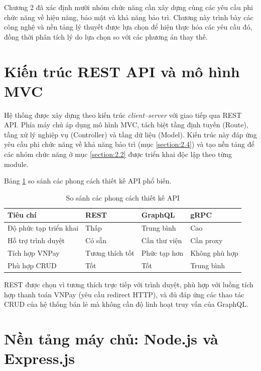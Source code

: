 \documentclass[../DoAn.tex]{subfiles}
\begin{document}
Chương 2 đã xác định mười nhóm chức năng cần xây dựng cùng các yêu cầu phi chức
năng về hiệu năng, bảo mật và khả năng bảo trì. Chương này trình bày các công nghệ
và nền tảng lý thuyết được lựa chọn để hiện thực hóa các yêu cầu đó, đồng thời
phân tích lý do lựa chọn so với các phương án thay thế.

\section{Kiến trúc REST API và mô hình MVC}
\label{section:3.1}

Hệ thống được xây dựng theo kiến trúc \textit{client--server} với giao tiếp qua
REST API. Phía máy chủ áp dụng mô hình MVC, tách biệt tầng
định tuyến (Route), tầng xử lý nghiệp vụ (Controller) và tầng dữ liệu (Model).
Kiến trúc này đáp ứng yêu cầu phi chức năng về khả năng bảo trì (mục
\ref{section:2.4}) và tạo nền tảng để các nhóm chức năng ở mục \ref{section:2.2}
được triển khai độc lập theo từng module.

Bảng \ref{tab:api-style} so sánh các phong cách thiết kế API phổ biến.

\begin{table}[H]
\centering
\caption{So sánh các phong cách thiết kế API}
\label{tab:api-style}
\begin{tabular}{|p{3cm}|p{3.5cm}|p{3.5cm}|p{2cm}|}
\hline
\textbf{Tiêu chí} & \textbf{REST} & \textbf{GraphQL} & \textbf{gRPC} \\
\hline
Độ phức tạp triển khai & Thấp & Trung bình & Cao \\
\hline
Hỗ trợ trình duyệt & Có sẵn & Cần thư viện & Cần proxy \\
\hline
Tích hợp \break VNPay & Tương thích tốt & Phức tạp hơn & Không phù hợp \\
\hline
Phù hợp CRUD & Tốt & Tốt & Trung bình \\
\hline
\end{tabular}
\end{table}

REST được chọn vì tương thích trực tiếp với trình duyệt, phù hợp với luồng tích
hợp thanh toán VNPay (yêu cầu redirect HTTP), và đủ đáp ứng các thao tác CRUD
của hệ thống bán lẻ mà không cần độ linh hoạt truy vấn của GraphQL.

\section{Nền tảng máy chủ: Node.js và Express.js}
\label{section:3.2}
\end{document}
